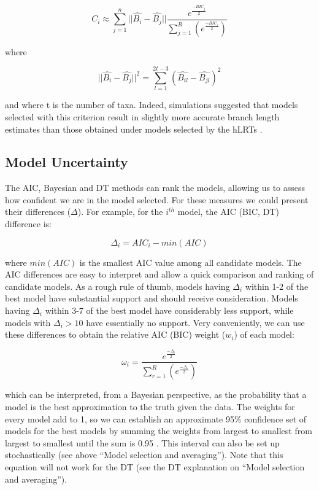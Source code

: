 \[
C_i \approx \sum_{j=1}^n||\hat{B_i} - \hat{B_j}||\frac{e^{\frac{-BIC_j}{2}}}{\sum_{j=1}^R(e^\frac{-BIC_i}{2})}
\]

where 

\[
||\hat{B_i} - \hat{B_j}||^2 = \sum_{l=1}^{2t-3}(\hat{B_{il}} - \hat{B_{jl}})^2
\]

and where t is the number of taxa. Indeed, simulations suggested that models selected with this criterion result in slightly more accurate branch length estimates than those obtained under models selected by the hLRTs \citep{Minin-2003, Abdo-2005}.

\subsection{Model Uncertainty}

The AIC, Bayesian and DT methods can rank the models, allowing us to assess how confident we are in the model selected. For these measures we could present their differences ($\Delta$). For example, for the $i^{th}$ model, the AIC (BIC, DT) difference is:

\[
\Delta_i = AIC_i - min(AIC)
\]

where $min(AIC)$ is the smallest AIC value among all candidate models. The AIC differences are easy to interpret and allow a quick comparison and ranking of candidate models. As a rough rule of thumb, models having $\Delta_i$ within 1-2 of the best model have substantial support and should receive consideration. Models having $\Delta_i$ within 3-7 of the best model have considerably less support, while models with $\Delta_i > 10$ have essentially no support. Very conveniently, we can use these differences to obtain the relative AIC (BIC) weight ($w_i$) of each model:

\[
\omega_i = \frac{e^{\frac{-\Delta_i}{2}}}{\sum_{r=1}^R(e^\frac{-\Delta_r}{2})}
\]

which can be interpreted, from a Bayesian perspective, as the probability that a model is the best approximation to the truth given the data. The weights for every model add to 1, so we can establish an approximate 95\% confidence set of models for the best models by summing the weights from largest to smallest from largest to smallest until the sum is 0.95 \citep{Burnham-1998, Burnham-2003}. This interval can also be set up stochastically (see above ``Model selection and averaging''). Note that this equation will not work for the DT (see the DT explanation on ``Model selection and averaging'').

